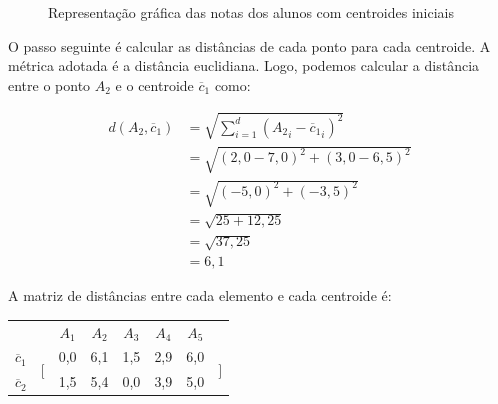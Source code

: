\begin{figure}[h]
	\centering
	
	
	
	\caption{Representação gráfica das notas dos alunos com centroides iniciais}
	\label{fig:dados-notas-alunos-centroides-iniciais}
\end{figure}

O passo seguinte é calcular as distâncias de cada ponto para cada centroide. A métrica adotada é a distância euclidiana. Logo, podemos calcular a distância entre o ponto $A_2$ e o centroide $\overline{c}_1$ como:

\begin{align*}
d(A_2, \overline{c}_1) &= \sqrt{\sum_{i=1}^{d} ({A_2}_i - {\overline{c}_1}_i)^2} \\[10pt]
&= \sqrt{(2,0 - 7,0)^2 + (3,0 - 6,5)^2} \\[10pt]
&= \sqrt{(-5,0)^2 + (-3,5)^2} \\[10pt]
&= \sqrt{25 + 12,25} \\[10pt]
&= \sqrt{37,25} \\[10pt]
&= 6,1
\end{align*}

A matriz de distâncias entre cada elemento e cada centroide é:

\insertspace

\begin{center}
	\begin{tabular}{cccccccc}
		& & $A_1$ & $A_2$ & $A_3$ & $A_4$ & $A_5$ & \\
		$\overline{c}_1$ & \multirow{2}{*}{$\Bigg[$} & 0,0  & 6,1  & 1,5  & 2,9  & 6,0  & \multirow{2}{*}{$\Bigg]$} \\
		\multicolumn{1}{l}{$\overline{c}_2$} & & 1,5  & 5,4  & 0,0  & 3,9  & 5,0  &                  
	\end{tabular}
\end{center}

